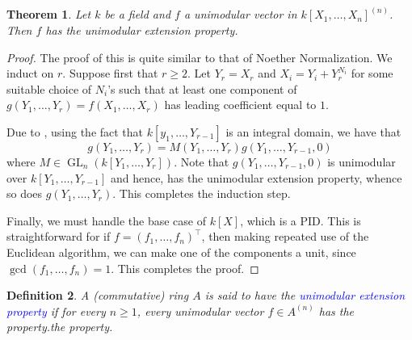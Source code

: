 \documentclass[12pt]{article}
\theoremstyle{thmstyle}
\newtheorem{theorem}{Theorem}[section]
\theoremstyle{defstyle}
\newtheorem{definition}[theorem]{Definition}
\newcommand{\GL}{\operatorname{GL}}
\newcommand{\define}[1]{\textcolor{blue}{\textit{#1}}}
\renewcommand{\ge}{\geqslant}
\begin{document}
\begin{theorem}
    Let $k$ be a field and $f$ a unimodular vector in $k[X_1,\dots,X_n]^{(n)}$. Then $f$ has the unimodular extension property.
\end{theorem}
\begin{proof}
    The proof of this is quite similar to that of Noether Normalization. We induct on $r$. Suppose first that $r\ge 2$. Let $Y_r = X_r$ and $X_i = Y_i + Y_r^{N_i}$ for some suitable choice of $N_i$'s such that at least one component of $g(Y_1,\dots,Y_r) = f(X_1,\dots,X_r)$ has leading coefficient equal to $1$.

    Due to , using the fact that $k[y_1,\dots,Y_{r - 1}]$ is an integral domain, we have that 
    \begin{equation*}
        g(Y_1,\dots, Y_r) = M(Y_1,\dots,Y_r)g(Y_1,\dots,Y_{r - 1}, 0)
    \end{equation*}
    where $M\in\GL_n\left(k[Y_1,\dots,Y_r]\right)$. Note that $g(Y_1,\dots,Y_{r - 1}, 0)$ is unimodular over $k[Y_1,\dots,Y_{r - 1}]$ and hence, has the unimodular extension property, whence so does $g(Y_1,\dots,Y_r)$. This completes the induction step.

    Finally, we must handle the base case of $k[X]$, which is a PID. This is straightforward for if $f = (f_1,\dots,f_n)^\top$, then making repeated use of the Euclidean algorithm, we can make one of the components a unit, since $\gcd(f_1,\dots,f_n) = 1$. This completes the proof.
\end{proof}

\begin{definition}
    A (commutative) ring $A$ is said to have the \define{unimodular extension property} if for every $n\ge 1$, every unimodular vector $f\in A^{(n)}$ has the property.the property.
\end{definition}
\end{document}
